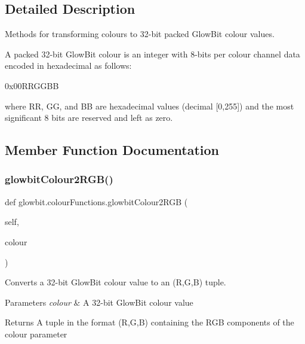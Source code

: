 \subsection{Detailed Description}
Methods for transforming colours to 32-\/bit packed Glow\+Bit colour values. 

A packed 32-\/bit Glow\+Bit colour is an integer with 8-\/bits per colour channel data encoded in hexadecimal as follows\+:

0x00\+R\+R\+G\+G\+BB

where RR, GG, and BB are hexadecimal values (decimal \mbox{[}0,255\mbox{]}) and the most significant 8 bits are reserved and left as zero. 

\subsection{Member Function Documentation}
\mbox{\label{classglowbit_1_1colourFunctions_a6f887561ea3261440350ac3b1df4a259}} 
\subsubsection{\texorpdfstring{glowbit\+Colour2\+R\+G\+B()}{glowbitColour2RGB()}}
{\footnotesize\ttfamily def glowbit.\+colour\+Functions.\+glowbit\+Colour2\+R\+GB (\begin{DoxyParamCaption}\item[{}]{self,  }\item[{}]{colour }\end{DoxyParamCaption})}



Converts a 32-\/bit Glow\+Bit colour value to an (R,G,B) tuple. 


\begin{DoxyParams}{Parameters}
{\em colour} & A 32-\/bit Glow\+Bit colour value \\
\hline
\end{DoxyParams}
\begin{DoxyReturn}{Returns}
A tuple in the format (R,G,B) containing the R\+GB components of the colour parameter 
\end{DoxyReturn}
\mbox{\label{classglowbit_1_1colourFunctions_ad547ff80671bd310aac42051d81e6660}} 

